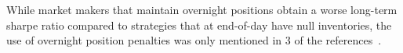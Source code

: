 While market makers that maintain overnight positions obtain a worse long-term sharpe ratio compared to strategies that at end-of-day have null inventories,
the use of overnight position penalties was only mentioned in 3 of the references~\citep{Jerome2022a, Selser2021a, Sun2022}.

\begin{figure}[H]
    \centering
\end{figure}

